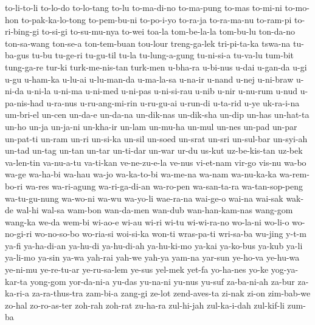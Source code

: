 {to-li-to-li to-lo-do to-lo-tang to-lu to-ma-di-no to-ma-pung to-mas
to-mi-ni to-mo-hon to-pak-ka-lo-tong to-pem-bu-ni to-po-i-yo to-ra-ja
to-ra-ma-nu to-ram-pi to-ri-bing-gi to-si-gi to-su-mu-nya to-wei toa-la
tom-be-la-la tom-bu-lu ton-da-no ton-sa-wang ton-se-a ton-tem-buan
tou-lour treng-ga-lek tri-pi-ta-ka tswa-na tu-ba-gus tu-bu tu-ge-ri
tu-gu-til tu-la tu-lung-a-gung tu-ni-si-a tu-va-lu tum-bit tung-ga-re
tur-ki turk-me-nis-tan turk-men u-bha-ra u-bi-nus u-dai u-gan-da u-gi u-gu
u-ham-ka u-lu-ai u-lu-man-da u-ma-la-sa u-na-ir u-nand u-nej u-ni-braw
u-ni-da u-ni-la u-ni-ma u-ni-med u-ni-pas u-ni-si-rau u-nib u-nir u-nu-rum
u-nud u-pa-nis-had u-ra-nus u-ru-ang-mi-rin u-ru-gu-ai u-run-di u-ta-rid
u-ye uk-ra-i-na um-bri-el un-cen un-da-e un-da-na un-dik-nas un-dik-sha
un-dip un-has un-hat-ta un-ho un-ja un-ja-ni un-kha-ir un-lam un-mu-ha
un-mul un-nes un-pad un-par un-pat-ti un-ram un-ri un-si-ka un-sil un-soed
un-srat un-sri un-sul-bar un-syi-ah un-tad un-tag un-tan un-tar un-ti-dar
un-war ur-du us-kut uz-be-kis-tan uz-bek va-len-tin va-nu-a-tu va-ti-kan
ve-ne-zu-e-la ve-nus vi-et-nam vir-go vis-nu wa-bo wa-ge wa-ha-bi wa-hau
wa-jo wa-ka-to-bi wa-me-na wa-nam wa-nu-ka-ka wa-rem-bo-ri wa-res
wa-ri-agung wa-ri-ga-di-an wa-ro-pen wa-san-ta-ra wa-tan-sop-peng
wa-tu-gu-nung wa-wo-ni wa-wu wa-yo-li wae-ra-na wai-ge-o wai-na wai-sak
wak-de wal-hi wal-sa wam-bon wan-da-men wan-dub wan-han-kam-nas wang-gom
wang-ka we-da wem-bi wi-ao-e wi-au wi-ri wi-tu wi-wi-ra-no wo-la-ni
wo-li-o wo-no-gi-ri wo-no-so-bo wo-ria-si woi-si-ka won-ti wras-pa-ti
wri-sa-ba wu-jing y-t-m ya-fi ya-ha-di-an ya-hu-di ya-hu-di-ah ya-hu-ki-mo
ya-kai ya-ko-bus ya-kub ya-li ya-li-mo ya-sin ya-wa yah-rai yah-we yah-ya
yam-na yar-sun ye-ho-va ye-hu-wa ye-ni-mu ye-re-tu-ar ye-ru-sa-lem ye-sus
yel-mek yet-fa yo-ha-nes yo-ke yog-ya-kar-ta yong-gom yor-da-ni-a yu-das
yu-na-ni yu-nus yu-suf za-ba-ni-ah za-bur za-ka-ri-a za-ra-thus-tra
zam-bi-a zang-gi ze-lot zend-aves-ta zi-nak zi-on zim-bab-we zo-hal
zo-ro-as-ter zoh-rah zoh-rat zu-ha-ra zul-hi-jah zul-ka-i-dah zul-kif-li
zum-ba
}%
